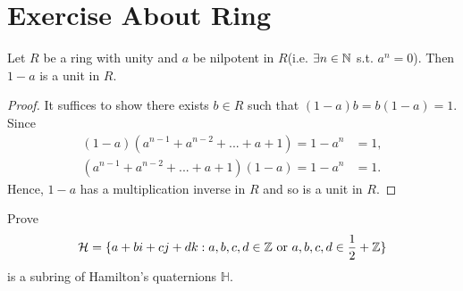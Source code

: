 \chapter{Exercise About Ring}

\begin{exercise}{}{}
    Let $R$ be a ring with unity and $a$ be nilpotent in $R$(i.e. $\exists n\in\mathbb{N}$ s.t. $a^n=0$). Then 
    $1-a$ is a unit in $R$.
\end{exercise}

\begin{proof}
    It suffices to show there exists $b\in R$ such that $(1-a)b=b(1-a)=1$.
    Since 
    \begin{align*}
        (1-a)(a^{n-1}+a^{n-2}+...+a+1)=1-a^n&=1,\\
        (a^{n-1}+a^{n-2}+...+a+1)(1-a)=1-a^n&=1.
    \end{align*}
    Hence, $1-a$ has a multiplication inverse in $R$ and so is a unit in $R$. 
\end{proof}

\begin{exercise}{}{}
    Prove
    \begin{align*}
        \mathcal{H}=\{a+bi+cj+dk:a,b,c,d\in\mathbb{Z} \text{ or } a,b,c,d\in \frac{1}{2}+\mathbb{Z}\}
    \end{align*}
    is a subring of Hamilton's quaternions $\mathbb{H}$.
\end{exercise}

